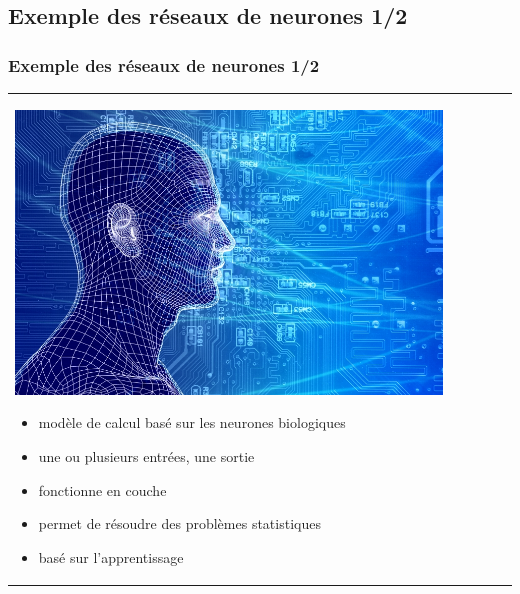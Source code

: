 \documentclass[handout]{beamer}
\begin{document}
	\subsection{Exemple des réseaux de neurones 1/2}
		\begin{frame}
		\frametitle{Exemple des réseaux de neurones 1/2}
		\begin{tabular}{l l}
			\begin{minipage}{0.4\textwidth}
				\begin{center}
					\includegraphics[width=0.9\textwidth]{images/neural_networking.jpg}
				\end{center}
			\end{minipage}

			\begin{minipage}{0.6\textwidth}
				\begin{itemize}
					\item modèle de calcul basé sur les neurones biologiques
					\item une ou plusieurs entrées, une sortie
					\item fonctionne en couche
					\item permet de résoudre des problèmes statistiques
					\item basé sur l'apprentissage
				\end{itemize}
			\end{minipage}
			
		\end{tabular}
		\end{frame}
\end{document}
